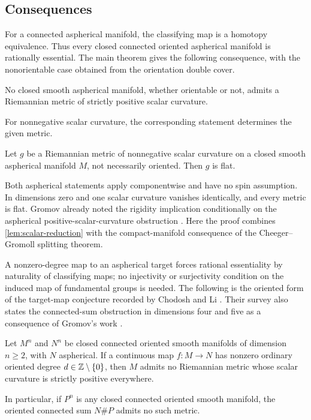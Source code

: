 \subsection{Consequences}

For a connected aspherical manifold, the classifying map is a homotopy
equivalence. Thus every closed connected oriented aspherical manifold is
rationally essential. The main theorem gives the following consequence, with the
nonorientable case obtained from the orientation double cover.

\begin{corollary}
\label{cor:aspherical}
No closed smooth aspherical manifold, whether orientable or not, admits a
Riemannian metric of strictly positive scalar curvature.
\end{corollary}

For nonnegative scalar curvature, the corresponding statement determines
the given metric.

\begin{corollary}
\label{cor:aspherical-flat}
Let $g$ be a Riemannian metric of nonnegative scalar curvature on a closed
smooth aspherical manifold $M$, not necessarily oriented. Then $g$ is flat.
\end{corollary}

Both aspherical statements apply componentwise and have no spin assumption.
In dimensions zero and one scalar curvature vanishes
identically, and every metric is flat. Gromov already noted the rigidity
implication conditionally on the aspherical positive-scalar-curvature
obstruction \cite[Section~3, following Conjecture~B]{GromovDozen2018}.
Here the proof combines \cref{lem:scalar-reduction} with the compact-manifold
consequence of the Cheeger--Gromoll splitting theorem.

A nonzero-degree map to an aspherical target forces rational essentiality by
naturality of classifying maps; no injectivity or surjectivity condition on
the induced map of fundamental groups is needed. The following is the
oriented form of the target-map conjecture recorded by Chodosh and Li
\cite[Conjecture~18]{ChodoshLiSurvey2023}. Their survey also states the
connected-sum obstruction in dimensions four and five as a consequence of
Gromov's work \cite[Theorem~17]{ChodoshLiSurvey2023}.

\begin{corollary}
\label{cor:degree-aspherical}
Let $M^n$ and $N^n$ be closed connected oriented smooth manifolds of
dimension $n\ge2$, with $N$ aspherical. If a continuous map $f:M\to N$
has nonzero ordinary oriented degree $d\in\mathbb Z\setminus\{0\}$, then $M$
admits no Riemannian metric whose scalar curvature is strictly positive
everywhere.

In particular, if $P^n$ is any closed connected oriented smooth manifold,
the oriented connected sum $N\#P$ admits no such metric.
\end{corollary}

